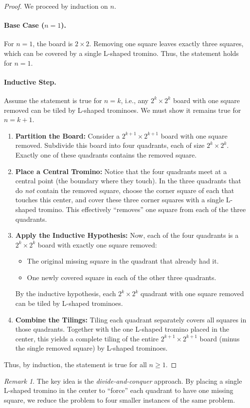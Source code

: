\documentclass{article}
\theoremstyle{remark}
\newtheorem*{remark}{Remark}
\begin{document}
\begin{proof}
We proceed by induction on $n$.

\paragraph{Base Case ($n=1$).}
For $n=1$, the board is $2 \times 2$. Removing one square leaves exactly three squares, which can be covered by a single L-shaped tromino. Thus, the statement holds for $n=1$.

\paragraph{Inductive Step.}
Assume the statement is true for $n=k$, i.e., any $2^k \times 2^k$ board with one square removed can be tiled by L-shaped trominoes. We must show it remains true for $n = k+1$.

\begin{enumerate}
  \item \textbf{Partition the Board:}  
  Consider a $2^{k+1} \times 2^{k+1}$ board with one square removed. Subdivide this board into four quadrants, each of size $2^k \times 2^k$. Exactly one of these quadrants contains the removed square.

  \item \textbf{Place a Central Tromino:}  
  Notice that the four quadrants meet at a central point (the boundary where they touch). In the three quadrants that do \emph{not} contain the removed square, choose the corner square of each that touches this center, and cover these three corner squares with a single L-shaped tromino. This effectively ``removes'' one square from each of the three quadrants.

  \item \textbf{Apply the Inductive Hypothesis:}  
  Now, each of the four quadrants is a $2^k \times 2^k$ board with exactly one square removed:
  \begin{itemize}
    \item The original missing square in the quadrant that already had it.
    \item One newly covered square in each of the other three quadrants.
  \end{itemize}
  By the inductive hypothesis, each $2^k \times 2^k$ quadrant with one square removed can be tiled by L-shaped trominoes.

  \item \textbf{Combine the Tilings:}  
  Tiling each quadrant separately covers all squares in those quadrants. Together with the one L-shaped tromino placed in the center, this yields a complete tiling of the entire $2^{k+1} \times 2^{k+1}$ board (minus the single removed square) by L-shaped trominoes.
\end{enumerate}

Thus, by induction, the statement is true for all $n \ge 1$.
\end{proof}


\begin{remark}
The key idea is the \emph{divide-and-conquer} approach. By placing a single L-shaped tromino in the center to ``force'' each quadrant to have one missing square, we reduce the problem to four smaller instances of the same problem.
\end{remark}
\end{document}
